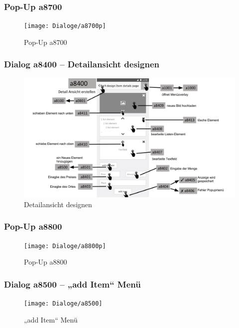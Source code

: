 \documentclass[a4paper,12pt,oneside]{scrartcl}
\begin{document}
\newpage
\subsubsection{Pop-Up a8700}
\begin{figure}[!htbp]
\centering
\noindent\texttt{[image: Dialoge/a8700p]}
\caption{Pop-Up a8700}
\end{figure}
\FloatBarrier

\newpage
\subsubsection{Dialog a8400 – Detailansicht designen}
\begin{figure}[!htbp]
\centering
\noindent\includegraphics[width=\linewidth,height=\textheight,keepaspectratio]{Dialoge/a8400}
\caption{Detailansicht designen}
\end{figure}
\FloatBarrier

\newpage
\subsubsection{Pop-Up a8800}
\begin{figure}[!htbp]
\centering
\noindent\texttt{[image: Dialoge/a8800p]}
\caption{Pop-Up a8800}
\end{figure}
\FloatBarrier

\newpage
\subsubsection{Dialog a8500 – „add Item“ Menü}
\begin{figure}[!htbp]
\centering
\noindent\texttt{[image: Dialoge/a8500]}
\caption{„add Item“ Menü}
\end{figure}
\FloatBarrier
\end{document}
